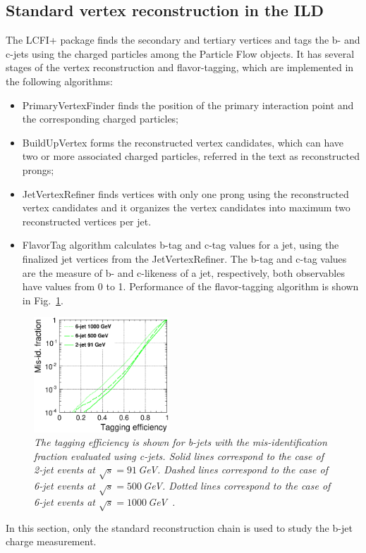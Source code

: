 

\subsection{Standard vertex reconstruction in the ILD}
The LCFI+ package finds the secondary and tertiary vertices and tags the b- and c-jets using the charged particles among the Particle Flow objects.
It has several stages of the vertex reconstruction and flavor-tagging, which are implemented in the following algorithms:
\begin{itemize}
\item PrimaryVertexFinder finds the position of the primary interaction point and the corresponding charged particles;
\item BuildUpVertex forms the reconstructed vertex candidates, which can have two or more associated charged particles, referred in the text as reconstructed prongs;
\item JetVertexRefiner finds vertices with only one prong using the reconstructed vertex candidates and it organizes the vertex candidates into maximum two reconstructed vertices per jet.
\item FlavorTag algorithm calculates b-tag and c-tag values for a jet, using the finalized jet vertices from the JetVertexRefiner. The b-tag and c-tag values are the measure of b- and c-likeness of a jet, respectively, both observables have values from 0 to 1. Performance of the flavor-tagging algorithm is shown in Fig.~\ref{fig:LCFIplus_3}.
\end{itemize}

\begin{figure}[h]
	{\centering
		\includegraphics[width=0.45\textwidth]{ILD/graphics/btag-cbg.eps}
		\caption{\sl The tagging efficiency is shown for b-jets with the mis-identification	fraction evaluated using c-jets. Solid lines correspond to the case of 2-jet events at $\sqrt{s} = 91$\,GeV. Dashed lines correspond to the case of 6-jet events at	$\sqrt{s} = 500$\,GeV. Dotted lines correspond to the case of 6-jet events at $\sqrt{s} = 1000$\,GeV~\cite{bib:LCFI}.
		}
		\label{fig:LCFIplus_3}
	}
\end{figure}
In this section, only the standard reconstruction chain is used to study the b-jet charge measurement. 


